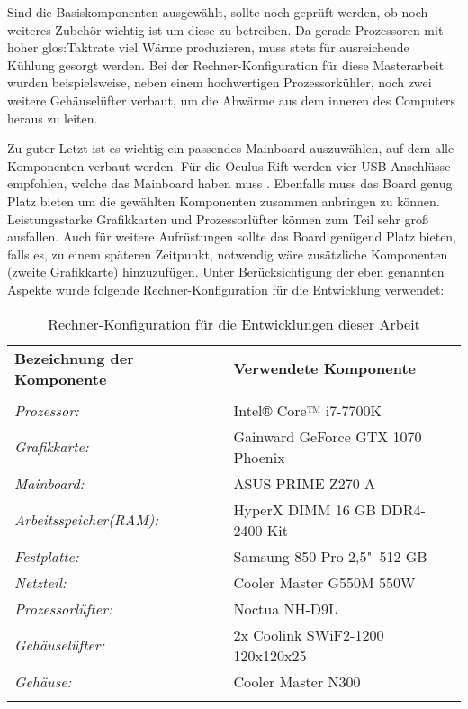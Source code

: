 Sind die Basiskomponenten ausgewählt, sollte noch geprüft werden, ob noch weiteres Zubehör wichtig ist um diese zu betreiben. Da gerade Prozessoren mit hoher \gls{glos:Taktrate} viel Wärme produzieren, muss stets für ausreichende Kühlung gesorgt werden. Bei der Rechner-Konfiguration für diese Masterarbeit wurden beispielsweise, neben einem hochwertigen Prozessorkühler, noch zwei weitere Gehäuselüfter verbaut, um die Abwärme aus dem inneren des Computers heraus zu leiten. 

Zu guter Letzt ist es wichtig ein passendes Mainboard auszuwählen, auf dem alle Komponenten verbaut werden. Für die Oculus Rift werden vier USB-Anschlüsse empfohlen, welche das Mainboard haben muss \cite{bib:OculusSpecs}. Ebenfalls muss das Board genug Platz bieten um die gewählten Komponenten zusammen anbringen zu können. Leistungsstarke Grafikkarten und Prozessorlüfter können zum Teil sehr groß ausfallen. Auch für weitere Aufrüstungen sollte das Board genügend Platz bieten, falls es, zu einem späteren Zeitpunkt, notwendig wäre zusätzliche Komponenten (zweite Grafikkarte) hinzuzufügen. Unter Berücksichtigung der eben genannten Aspekte wurde folgende Rechner-Konfiguration für die Entwicklung verwendet:\\  

\begin{table}[h]
 \begin{tabular}{ll}
  \textbf{Bezeichnung der Komponente} & \textbf{Verwendete Komponente}\\
  \\
  
  \textit{Prozessor:} & Intel® Core™ i7-7700K\\
  \textit{Grafikkarte:} & Gainward GeForce GTX 1070 Phoenix\\
  \textit{Mainboard:} & ASUS PRIME Z270-A\\
  \textit{Arbeitsspeicher(RAM):} & HyperX DIMM 16 GB DDR4-2400 Kit\\
  \textit{Festplatte:} & Samsung 850 Pro 2,5"\ 512 GB\\
  \textit{Netzteil:} & Cooler Master G550M 550W\\
  \textit{Prozessorlüfter:} & Noctua NH-D9L\\
  \textit{Gehäuselüfter:} & 2x Coolink SWiF2-1200 120x120x25\\
  \textit{Gehäuse:} & Cooler Master N300\\
\\
 \end{tabular}
 \caption{Rechner-Konfiguration für die Entwicklungen dieser Arbeit}
 \label{tab:Rechnerkonfig}
 \end{table}


